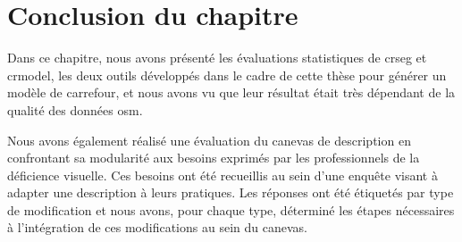 \section{Conclusion du chapitre}

Dans ce chapitre, nous avons présenté les évaluations statistiques de crseg et crmodel, les deux outils développés dans le cadre de cette thèse pour générer un modèle de carrefour,  et nous avons vu que leur résultat était très dépendant de la qualité des données \gls{osm}. 

\newpar{}

Nous avons également réalisé une évaluation du canevas de description en confrontant sa modularité aux besoins exprimés par les professionnels de la déficience visuelle. Ces besoins ont été recueillis au sein d'une enquête visant à adapter une description à leurs pratiques. Les réponses ont été étiquetés par type de modification et nous avons, pour chaque type, déterminé les étapes nécessaires à l'intégration de ces modifications au sein du canevas.